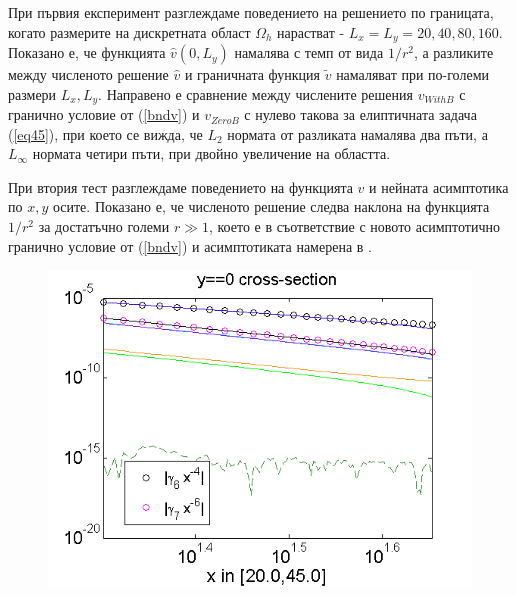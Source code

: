 \documentclass[a5paper]{article}
\newcommand{\rf}[1]{(\ref{#1})}
\theoremstyle{remark}
\begin{document}
\begin{large}
При първия експеримент разглеждаме поведението на решението по границата, когато размерите на дискретната област $\Omega_h$ нарастват - $L_x = L_y = 20, 40, 80, 160$. Показано е, че функцията $\widehat v(0,L_y)$ намалява с темп от вида $1/r^2$, а разликите между численото решение $\widehat v$ и граничната функция $\tilde v$ намаляват при по-големи размери $L_x, L_y$. Направено е сравнение между числените решения $v_{WithB}$ с гранично условие от \rf{bndv} и $v_{ZeroB}$ с нулево такова за елиптичната задача \rf{eq45}, при което се вижда, че $L_2$ нормата от разликата намалява два пъти, а $L_\infty$ нормата четири пъти, при двойно увеличение на областта. 

При втория тест разглеждаме поведението на функцията $\widehat v$ и нейната асимптотика по $x,y$ осите. Показано е, че численото решение следва наклона на функцията $1/r^2$ за достатъчно големи $r \gg 1$, което е в съответствие с новото асимптотично гранично условие от \rf{bndv} и асимптотиката намерена в \cite{ref116}.\\
\begin{figure}[ht]
	\begin{minipage}[b]{0.85\linewidth}
		\includegraphics[width=\linewidth]{AssymptForEachTerm/c017_bt1_5/ChristovIC_AlongX_50_ZB2_bt1_c017_h020_O(h^6).png}
	\end{minipage}
	\begin{minipage}[b]{0.85\linewidth}

\end{minipage}
\end{figure}
\end{large}
\end{document}
